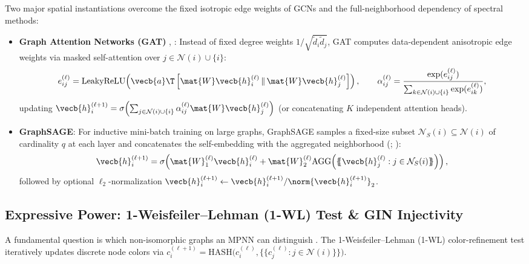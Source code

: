 \documentclass[../../../../master.tex]{subfiles}
\begin{document}
Two major spatial instantiations overcome the fixed isotropic edge weights of GCNs and the full-neighborhood dependency of spectral methods:
\begin{itemize}
  \item \textbf{Graph Attention Networks (GAT)} , : Instead of fixed degree weights $1/\sqrt{\tilde{d}_i\tilde{d}_j}$, GAT computes data-dependent anisotropic edge weights via masked self-attention over $j \in \mathcal{N}(i) \cup \{i\}$:
  \begin{equation}
    e_{ij}^{(\ell)} = \mathrm{LeakyReLU}\!\left(\vecb{a}\T \left[\mat{W}\vecb{h}_i^{(\ell)} \,\|\, \mat{W}\vecb{h}_j^{(\ell)}\right]\right), \qquad \alpha_{ij}^{(\ell)} = \frac{\exp(e_{ij}^{(\ell)})}{\sum_{k \in \mathcal{N}(i)\cup\{i\}} \exp(e_{ik}^{(\ell)})}, \label{eq:gnn:gat}
  \end{equation}
  updating $\vecb{h}_i^{(\ell+1)} = \sigma\!\left(\sum_{j \in \mathcal{N}(i)\cup\{i\}} \alpha_{ij}^{(\ell)}\mat{W}\vecb{h}_j^{(\ell)}\right)$ (or concatenating $K$ independent attention heads).
  \item \textbf{GraphSAGE}: For inductive mini-batch training on large graphs, GraphSAGE samples a fixed-size subset $\mathcal{N}_S(i) \subseteq \mathcal{N}(i)$ of cardinality $q$ at each layer and concatenates the self-embedding with the aggregated neighborhood (; ):
  \begin{equation}
    \vecb{h}_i^{(\ell+1)} = \sigma\!\left(\mat{W}_1^{(\ell)}\vecb{h}_i^{(\ell)} + \mat{W}_2^{(\ell)} \mathrm{AGG}\!\left(\{\!\!\{\vecb{h}_j^{(\ell)} : j \in \mathcal{N}_S(i)\}\!\!\}\right)\right), \label{eq:gnn:graphsage}
  \end{equation}
  followed by optional $\ell_2$-normalization $\vecb{h}_i^{(\ell+1)} \leftarrow \vecb{h}_i^{(\ell+1)} / \norm{\vecb{h}_i^{(\ell+1)}}_2$.
\end{itemize}

\subsection{Expressive Power: 1-Weisfeiler--Lehman (1-WL) Test \& GIN Injectivity}
\label{sec:gnn:wl}

{\sloppy A fundamental question is which non-isomorphic graphs an MPNN can distinguish . The 1-Weisfeiler--Lehman (1-WL) color-refinement test  iteratively updates discrete node colors via $c_i^{(\ell+1)} = \mathrm{HASH}\big(c_i^{(\ell)}, \{\!\!\{c_j^{(\ell)} : j \in \mathcal{N}(i)\}\!\!\}\big)$.\par}
\end{document}
